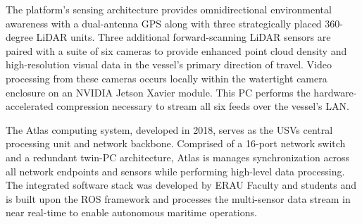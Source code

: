 \documentclass{erauthesis}
\begin{document}
The platform's sensing architecture provides omnidirectional environmental awareness with a dual-antenna \ac{GPS} along with three strategically placed 360-degree \ac{LiDAR} units.
Three additional forward-scanning \ac{LiDAR} sensors are paired with a suite of six cameras to provide enhanced point cloud density and high-resolution visual data in the vessel's primary direction of travel. 
Video processing from these cameras occurs locally within the watertight camera enclosure on an NVIDIA Jetson Xavier module.
This PC performs the hardware-accelerated compression necessary to stream all six feeds over the vessel's \ac{LAN}.

The Atlas computing system, developed in 2018, serves as the \acp{USV} central processing unit and network backbone.
Comprised of a 16-port network switch and a redundant twin-PC architecture, Atlas is manages synchronization across all network endpoints and sensors while performing high-level data processing.
The integrated software stack was developed by \ac{ERAU} Faculty and students and is built upon the \ac{ROS} framework and processes the multi-sensor data stream in near real-time to enable autonomous maritime operations.

\end{document}
